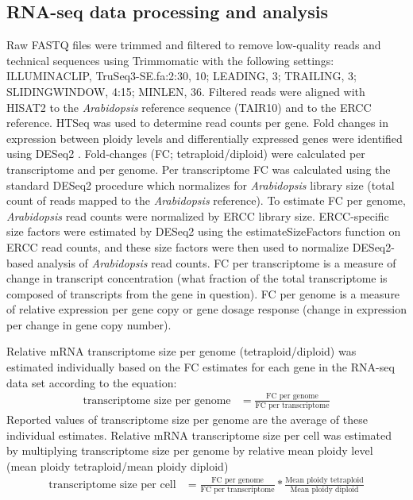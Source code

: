 \documentclass[11pt]{article}
\begin{document}
\subsection*{RNA-seq data processing and analysis}
Raw FASTQ files were trimmed and filtered to remove low-quality reads and technical sequences using Trimmomatic \citep{bolger2014} with the following settings: ILLUMINACLIP, TruSeq3-SE.fa:2:30, 10; LEADING, 3; TRAILING, 3; SLIDINGWINDOW, 4:15; MINLEN, 36.
Filtered reads were aligned with HISAT2 \citep{pertea2016} to the \textit{Arabidopsis} reference sequence (TAIR10) and to the ERCC reference.
HTSeq \citep{anders2015} was used to determine read counts per gene.
Fold changes in expression between ploidy levels and differentially expressed genes were identified using DESeq2 \citep{love2014}.
Fold-changes (FC; tetraploid/diploid) were calculated per transcriptome and per genome.
Per transcriptome FC was calculated using the standard DESeq2 procedure which normalizes for \textit{Arabidopsis} library size (total count of reads mapped to the \textit{Arabidopsis} reference).
To estimate FC per genome, \textit{Arabidopsis} read counts were normalized by ERCC library size.
ERCC-specific size factors were estimated by DESeq2 using the estimateSizeFactors function on ERCC read counts, and these size factors were then used to normalize DESeq2-based analysis of \textit{Arabidopsis} read counts.
FC per transcriptome is a measure of change in transcript concentration (what fraction of the total transcriptome is composed of transcripts from the gene in question).
FC per genome is a measure of relative expression per gene copy or gene dosage response (change in expression per change in gene copy number).

Relative mRNA transcriptome size per genome (tetraploid/diploid) was estimated individually based on the FC estimates for each gene in the RNA-seq data set according to the equation:
\begin{align*}
\text{transcriptome size per genome}&=\frac{\text{FC per genome}}{\text{FC per transcriptome}}
\end{align*}
Reported values of transcriptome size per genome are the average of these individual estimates.
Relative mRNA transcriptome size per cell was estimated by multiplying transcriptome size per genome by relative mean ploidy level (mean ploidy tetraploid/mean ploidy diploid)
\begin{align*}
\text{transcriptome size per cell}&=\frac{\text{FC per genome}}{\text{FC per transcriptome}}*\frac{\text{Mean ploidy tetraploid}}{\text{Mean ploidy diploid}}
\end{align*}
\end{document}

